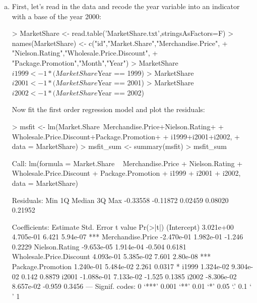 \documentclass{article}
\begin{document}
\begin{enumerate}[a)]
\item{} First, let's read in the data and recode the year variable into an indicator with a base of the year 2000:

\begin{Schunk}
\begin{Sinput}
> MarketShare <- read.table('MarketShare.txt',stringsAsFactors=F)
> names(MarketShare) <- c("id","Market.Share","Merchandise.Price",
+                         "Nielson.Rating","Wholesale.Price.Discount",
+                         "Package.Promotion","Month","Year")
> MarketShare$i1999 <- 1*(MarketShare$Year == 1999)
> MarketShare$i2001 <- 1*(MarketShare$Year == 2001) 
> MarketShare$i2002 <- 1*(MarketShare$Year == 2002)
\end{Sinput}
\end{Schunk}

Now fit the first order regression model and plot the residuals:

\begin{Schunk}
\begin{Sinput}
> msfit <- lm(Market.Share~Merchandise.Price+Nielson.Rating+
+               Wholesale.Price.Discount+Package.Promotion+
+               i1999+i2001+i2002,
+             data = MarketShare)
> msfit_sum <- summary(msfit)
> msfit_sum
\end{Sinput}
\begin{Soutput}
Call:
lm(formula = Market.Share ~ Merchandise.Price + Nielson.Rating + 
    Wholesale.Price.Discount + Package.Promotion + i1999 + i2001 + 
    i2002, data = MarketShare)

Residuals:
     Min       1Q   Median       3Q      Max 
-0.33558 -0.11872  0.02459  0.08020  0.21952 

Coefficients:
                           Estimate Std. Error t value Pr(>|t|)    
(Intercept)               3.021e+00  4.705e-01   6.421 5.94e-07 ***
Merchandise.Price        -2.470e-01  1.982e-01  -1.246   0.2229    
Nielson.Rating           -9.653e-05  1.914e-04  -0.504   0.6181    
Wholesale.Price.Discount  4.093e-01  5.385e-02   7.601 2.80e-08 ***
Package.Promotion         1.240e-01  5.484e-02   2.261   0.0317 *  
i1999                     1.324e-02  9.304e-02   0.142   0.8879    
i2001                    -1.088e-01  7.133e-02  -1.525   0.1385    
i2002                    -8.306e-02  8.657e-02  -0.959   0.3456    
---
Signif. codes:  0 ‘***’ 0.001 ‘**’ 0.01 ‘*’ 0.05 ‘.’ 0.1 ‘ ’ 1


\end{Soutput}
\end{Schunk}
\end{enumerate}
\end{document}
